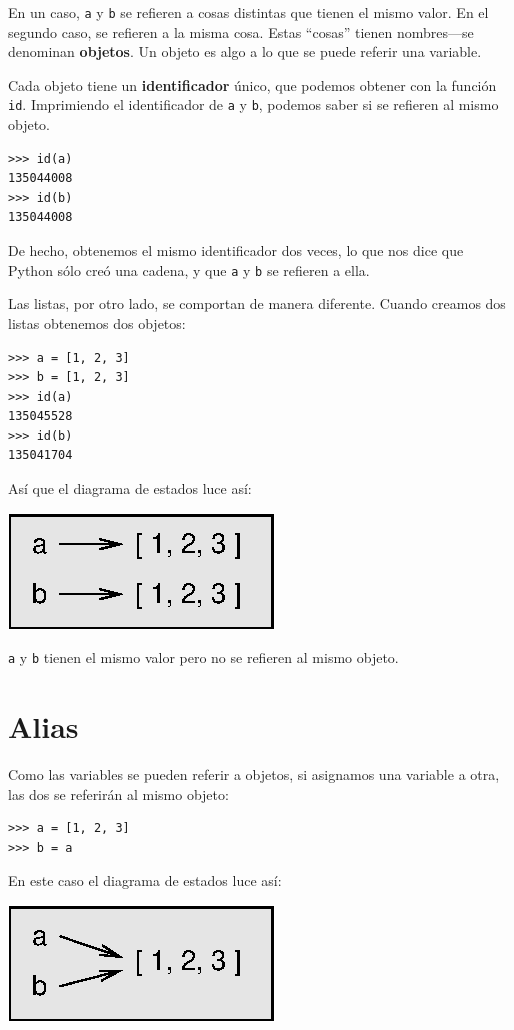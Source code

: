 En un caso, \texttt{a} y \texttt{b} se refieren a cosas distintas
que tienen el mismo valor. En el segundo caso, se refieren a la misma
cosa. Estas ``cosas'' tienen nombres—se denominan \textbf{objetos}.
Un objeto es algo a lo que se puede referir una variable.

Cada objeto tiene un \textbf{identificador} único, que podemos obtener
con la función \texttt{id}. Imprimiendo el identificador de \texttt{a}
y \texttt{b}, podemos saber si se refieren al mismo objeto.
\begin{verbatim}
>>> id(a)
135044008
>>> id(b)
135044008
\end{verbatim}

De hecho, obtenemos el mismo identificador dos veces, lo que nos dice
que Python sólo creó una cadena, y que \texttt{a} y \texttt{b} se
refieren a ella.

Las listas, por otro lado, se comportan de manera diferente. Cuando
creamos dos listas obtenemos dos objetos:
\begin{verbatim}
>>> a = [1, 2, 3]
>>> b = [1, 2, 3]
>>> id(a)
135045528
>>> id(b)
135041704
\end{verbatim}

Así que el diagrama de estados luce así:

\beforefig \centerline{\includegraphics{illustrations/list2}}
\afterfig

\texttt{a} y \texttt{b} tienen el mismo valor pero no se refieren
al mismo objeto.

\section{Alias}

 

Como las variables se pueden referir a objetos, si asignamos una variable
a otra, las dos se referirán al mismo objeto:
\begin{verbatim}
>>> a = [1, 2, 3]
>>> b = a
\end{verbatim}

En este caso el diagrama de estados luce así:

\beforefig \centerline{\includegraphics{illustrations/list3}}
\afterfig

